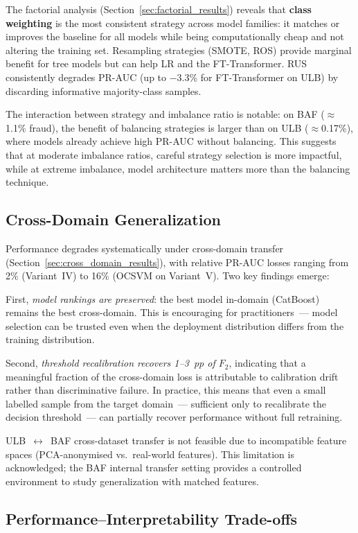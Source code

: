 The factorial analysis (Section~\ref{sec:factorial_results}) reveals
that \textbf{class weighting} is the most consistent strategy across
model families: it matches or improves the baseline for all models
while being computationally cheap and not altering the training set.
Resampling strategies (SMOTE, ROS) provide marginal benefit for tree
models but can help LR and the FT-Transformer.
RUS consistently degrades PR-AUC (up to $-$3.3\% for FT-Transformer
on ULB) by discarding informative majority-class samples.

The interaction between strategy and imbalance ratio is notable:
on BAF ($\approx$1.1\% fraud), the benefit of balancing strategies
is larger than on ULB ($\approx$0.17\%), where models already achieve
high PR-AUC without balancing.
This suggests that at moderate imbalance ratios, careful strategy
selection is more impactful, while at extreme imbalance, model
architecture matters more than the balancing technique.

\subsection{Cross-Domain Generalization}

Performance degrades systematically under cross-domain transfer
(Section~\ref{sec:cross_domain_results}), with relative PR-AUC losses
ranging from 2\% (Variant~IV) to 16\% (OCSVM on Variant~V).
Two key findings emerge:

First, \emph{model rankings are preserved}: the best model in-domain
(CatBoost) remains the best cross-domain.
This is encouraging for practitioners~--- model selection can be trusted
even when the deployment distribution differs from the training distribution.

Second, \emph{threshold recalibration recovers 1--3~pp of $F_2$},
indicating that a meaningful fraction of the cross-domain loss is
attributable to calibration drift rather than discriminative failure.
In practice, this means that even a small labelled sample from the
target domain~--- sufficient only to recalibrate the decision threshold~---
can partially recover performance without full retraining.

ULB~$\leftrightarrow$~BAF cross-dataset transfer is not feasible due
to incompatible feature spaces (PCA-anonymised vs.\ real-world features).
This limitation is acknowledged; the BAF internal transfer setting
provides a controlled environment to study generalization with matched features.

\subsection{Performance--Interpretability Trade-offs}

